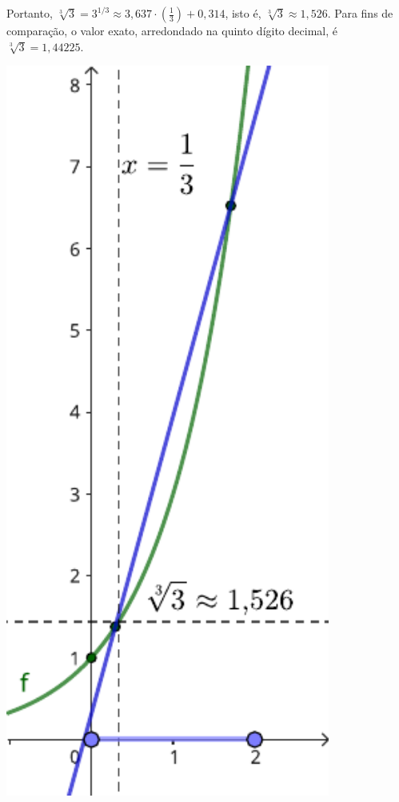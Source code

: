 \documentclass[12pt,a4paper]{article}
\begin{document}
\begin{ExerciseList}
\begin{minipage}{0.75\textwidth}
Portanto, $\sqrt[3]{3} = 3^{1/3} \approx 3,637 \cdot \left(\frac{1}{3}\right) + 0,314$, isto é, $\boxed{\sqrt[3]{3} \approx 1,526}$. Para fins de comparação, o valor exato, arredondado na quinto dígito decimal, é $\sqrt[3]{3} = 1,44225$.
\end{minipage}\hfill
\begin{minipage}{0.25\textwidth}
    \centering
    \includegraphics[width=0.8\textwidth]{img/interpolação-chebyshev.pdf}
\end{minipage}



\end{ExerciseList}
\end{document}
